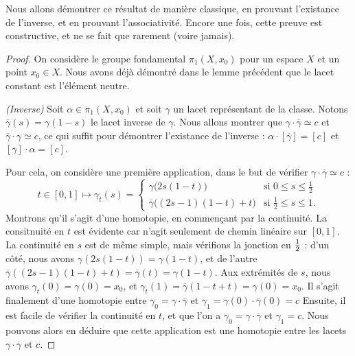 Nous allons démontrer ce résultat de manière classique, en prouvant l'existance de l'inverse, et en prouvant l'associativité. Encore une fois, cette preuve est constructive, et ne se fait que rarement (voire jamais).

\begin{proof}
On considère le groupe fondamental $\pi_1(X,x_0)$ pour un espace $X$ et un point $x_0\in X$. Nous avons déjà démontré dans le lemme précédent que le lacet constant est l'élément neutre.

\bigskip \textit{(Inverse)} Soit $\alpha\in\pi_1(X,x_0)$ et soit $\gamma$ un lacet représentant de la classe. Notons $\overline{\gamma}(s)=\gamma(1-s)$ le lacet inverse de $\gamma$. Nous allons montrer que $\gamma\cdot\overline{\gamma}\simeq c$ et $\overline{\gamma}\cdot\gamma\simeq c$, ce qui suffit pour démontrer l'existance de l'inverse : $\alpha\cdot [\overline{\gamma}]=[c]$ et $[\overline{\gamma}]\cdot \alpha=[c]$.

Pour cela, on considère une première application, dans le but de vérifier $\gamma\cdot \overline{\gamma}\simeq c$ : \[t\in[0,1]\mapsto\gamma_t(s)=\left\{\begin{matrix}
\gamma\big(2s(1-t)\big)&\text{si }0\leq s\leq \frac{1}{2}\\ 
\overline{\gamma}\big((2s-1)(1-t)+t\big)&\text{si }\frac{1}{2}\leq s\leq 1.
\end{matrix}\right.\]Montrons qu'il s'agit d'une homotopie, en commençant par la continuité. La consitnuité en $t$ est évidente car n'agit seulement de chemin linéaire sur $[0,1]$. La continuité en $s$ est de même simple, mais vérifions la jonction en $1\over2$ : d'un côté, nous avons $\gamma(2s(1-t))=\gamma(1-t)$, et de l'autre $\overline{\gamma}((2s-1)(1-t)+t)=\overline{\gamma}(t)=\gamma(1-t)$. Aux extrémités de $s$, nous avons $\gamma_t(0)=\gamma(0)=x_0$, et $\gamma_t(1)=\overline{\gamma}(1-t+t)=\gamma(0)=x_0$. Il s'agit finalement d'une homotopie entre $\gamma_0=\gamma\cdot \overline{\gamma}$ et $\gamma_1=\gamma(0)\cdot\overline{\gamma}(0)=c$  Ensuite, il est facile de vérifier la continuité en $t$, et que l'on a $\gamma_0=\gamma\cdot\overline{\gamma}$ et $\gamma_1=c$. Nous pouvons alors en déduire que cette application est une homotopie entre les lacets $\gamma\cdot\overline{\gamma}$ et $c$.


\end{proof}
